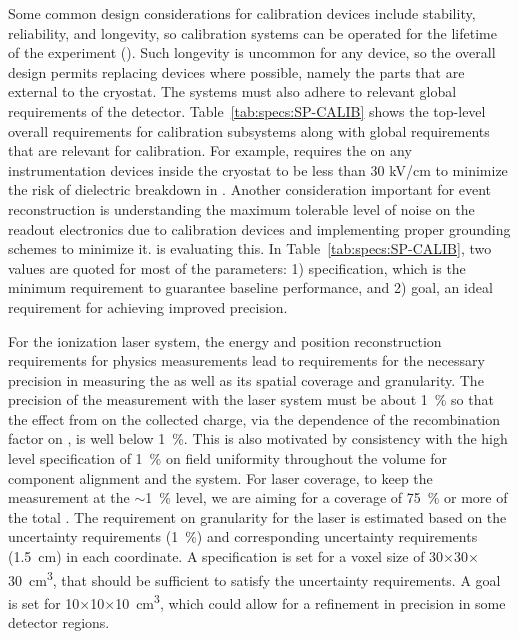 

Some common design considerations for calibration devices include stability, reliability, and longevity, so calibration systems can be operated for the lifetime of the experiment (\dunelifetime). Such longevity is uncommon for any device, so the overall design permits replacing devices where possible, namely the parts that are external to the cryostat. The systems must also adhere to relevant global requirements of the  detector. Table~\ref{tab:specs:SP-CALIB} shows the top-level overall requirements for calibration subsystems along with global  requirements that are relevant for calibration. For example,  requires the \efield  on any instrumentation devices inside the cryostat to be less than 30 kV/cm to minimize the risk of dielectric breakdown in . Another consideration important for event reconstruction is understanding the maximum tolerable level of noise on the readout electronics due to calibration devices and implementing proper grounding schemes to minimize it. 
 is evaluating this. In Table~\ref{tab:specs:SP-CALIB}, two values are quoted for most of the parameters: 1) specification, which is the minimum requirement to guarantee baseline performance, and 2) goal, an ideal requirement %
for achieving improved precision.

For the ionization laser system, the energy and position reconstruction requirements for physics measurements lead to requirements for the necessary precision in measuring the  \efield as well as its spatial coverage and granularity. The precision of the \efield measurement with the laser system must be about \SI{1}{\%} so that the effect from \efield on the collected charge, via the dependence of the recombination factor on \efield, is well below \SI{1}{\%}. This is also motivated by consistency with the high level  specification of \SI{1}{\%} on field uniformity throughout the volume for component alignment and the  system. For laser coverage, to keep the \efield measurement at the $\sim$\SI{1}{\%} level, we are aiming for a coverage of \SI{75}{\%} or more of the total . The requirement on granularity for the laser is estimated based on the  uncertainty requirements (\SI{1}{\%}) and corresponding uncertainty requirements (\SI{1.5}{\cm}) in each coordinate. A specification is set for a voxel size of \num{30}$\times$\num{30}$\times$\SI{30}{\cubic\cm}, that should be sufficient to satisfy the  uncertainty requirements. A goal is set for \num{10}$\times$\num{10}$\times$\SI{10}{\cubic\cm}, which could allow for a refinement in precision in some detector regions. 

